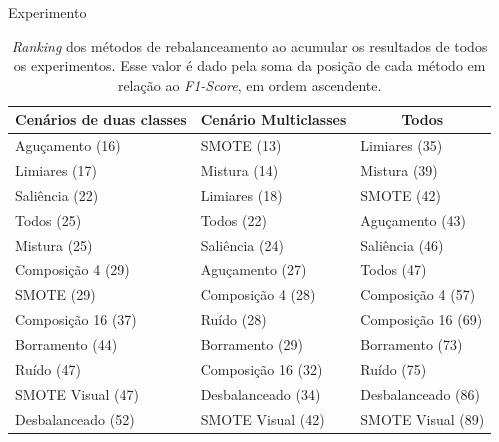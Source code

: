 \documentclass{beamer}
\begin{document}
\begin{frame}{Experimento}
  \begin{table}[!htbp]
  \centering
  \caption{\textit{Ranking} dos métodos de rebalanceamento ao acumular os resultados de todos os experimentos. Esse valor é dado pela soma da posição de cada método em relação ao \textit{F1-Score}, em ordem ascendente.}
  \label{tab:allranking}
  \begin{tabular}{|l|l|l|}
  \hline
  \multicolumn{1}{|c|}{\textbf{Cenários de duas classes}} & \multicolumn{1}{c|}{\textbf{Cenário Multiclasses}} & \multicolumn{1}{c|}{\textbf{Todos}} \\ \hline
  Aguçamento (16)                                         & SMOTE (13)                                         & Limiares (35)                       \\ \hline
  Limiares (17)                                           & Mistura (14)                                       & Mistura (39)                        \\ \hline
  Saliência (22)                                          & Limiares (18)                                      & SMOTE (42)                          \\ \hline
  Todos (25)                                              & Todos (22)                                         & Aguçamento (43)                     \\ \hline
  Mistura (25)                                            & Saliência (24)                                     & Saliência (46)                      \\ \hline
  Composição 4 (29)                                       & Aguçamento (27)                                    & Todos (47)                          \\ \hline
  SMOTE (29)                                              & Composição 4 (28)                                  & Composição 4 (57)                   \\ \hline
  Composição 16 (37)                                      & Ruído (28)                                         & Composição 16 (69)                  \\ \hline
  Borramento (44)                                         & Borramento (29)                                    & Borramento (73)                     \\ \hline
  Ruído (47)                                              & Composição 16 (32)                                 & Ruído (75)                          \\ \hline
  SMOTE Visual (47)                                       & Desbalanceado (34)                                 & Desbalanceado (86)                  \\ \hline
  Desbalanceado (52)                                      & SMOTE Visual (42)                                  & SMOTE Visual (89)                   \\ \hline
  \end{tabular}
  \end{table}
\end{frame}
\end{document}
